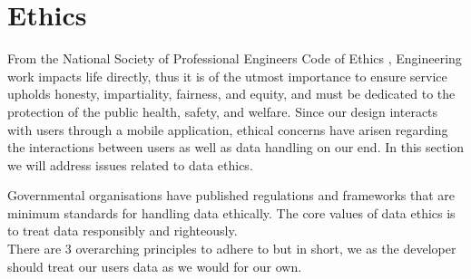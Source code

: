 \section{Ethics}
From the National Society of Professional Engineers Code of Ethics , Engineering
work impacts life directly, thus it is of the utmost importance to ensure service 
upholds honesty, impartiality, fairness, and equity, and must be dedicated to the protection of
the public health, safety, and welfare. Since our design interacts with users
through a mobile application, ethical concerns have arisen regarding the interactions between users 
as well as data handling on our end. In this section we will address issues related to data ethics.

Governmental organisations have published regulations  and frameworks
 that are minimum standards for handling data ethically. The core values of data ethics 
is to treat data responsibly and righteously.
\\
There are 3 overarching principles to adhere to but in short, we as the developer should treat our 
users\textsc{} data as we would for our own.

